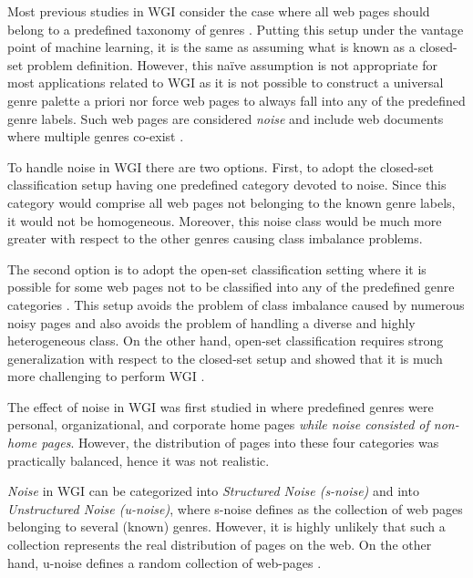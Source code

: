Most previous studies in WGI consider the case where all web pages should belong to a predefined taxonomy of genres \parencite{Lim2005,santini2007automatic,kanaris2009learning,jebari2014pureURL}. Putting this setup under the vantage point of machine learning, it is the same as assuming what is known as a closed-set problem definition. However, this naïve assumption is not appropriate for most applications related to WGI as it is not possible to construct a universal genre palette a priori nor force web pages to always fall into any of the predefined genre labels. Such web pages are considered \textit{noise} and include web documents where multiple genres co-exist \parencite{santini2011cross,levering2008using}. 

To handle noise in WGI there are two options. First, to adopt the closed-set classification setup having one predefined category devoted to noise. Since this category would comprise all web pages not belonging to the known genre labels, it would not be homogeneous. Moreover, this noise class would be much more greater with respect to the other genres causing class imbalance problems. 

The second option is to adopt the open-set classification setting where it is possible for some web pages not to be classified into any of the predefined genre categories \parencite{pritsos2013open,pritsos2015clef,pritsos2018open}. This setup avoids the problem of class imbalance caused by numerous noisy pages and also avoids the problem of handling a diverse and highly heterogeneous class. On the other hand, open-set classification requires strong generalization with respect to the closed-set setup \parencite{scheirer2013toward} and showed that it is much more challenging to perform WGI \parencite{Asheghi2015}.

The effect of noise in WGI  was first studied in \parencite{shepherd2004cybergenre,kennedy2005automatic,dong2006binary,levering2008using} where predefined genres were personal, organizational, and corporate home pages \textit{while noise consisted of non-home pages}. However, the distribution of pages into these four categories was practically balanced, hence it was not realistic.

\textit{Noise} in WGI can be categorized into \textit{Structured Noise (s-noise)} and into \textit{Unstructured Noise (u-noise)}, where s-noise defines as the collection of web pages belonging to several (known) genres. However, it is highly unlikely that such a collection  represents the real distribution of pages on the web. On the other hand, u-noise defines a random collection of web-pages \parencite{santini2011cross}.

